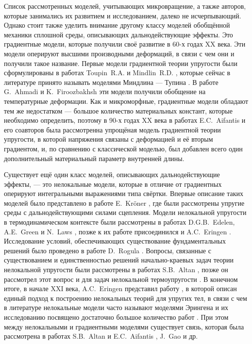 \ifsynopsis
\else
Список рассмотренных моделей, учитывающих микровращение, а также авторов, которые занимались их развитием и исследованием, далеко не исчерпывающий. Однако стоит также уделить внимание другому классу моделей обобщённой механики сплошной среды, описывающих дальнодействующие эффекты. Это градиентные модели, которые получили своё развитие в 60-х годах XX века. Эти модели оперируют высшими производными деформаций, в связи с чем они и получили такое название. Первые модели градиентной теории упругости были сформулированы в работах Toupin~R.A. \cite{Toupin} и Mindlin~R.D. \cite{Mindlin4, Mindlin5}, которые сейчас в литературе принято называть моделями Миндлина --- Тупина \cite{ToupinMindlin1, ToupinMindlin2, ToupinMindlin3}. В работе G.~Ahmadi и K.~Firoozbakhsh \cite{GradientThermoelasticity} эти модели получили обобщение на температурные деформации. Как и микроморфные, градиентные модели обладают тем же недостатком --- большое количество материальных констант, которые необходимо определить, поэтому в 90-х годах XX века в работах E.C.~Aifantis и его соавторов \cite{Aifantis1, Aifantis2} была рассмотренна упрощёная модель градиентной теории упругости, в которой напряжения связаны с деформацией и её вторым градиентом, и, по сравнению с классической моделью, был добавлен всего один дополнительный материальный параметр внутренней длины.
\fi

\ifsynopsis
\else
Существует ещё один класс моделей, описывающих дальнодействующие эффекты, --- это нелокальные модели, которые в отличие от градиентных оперируют интегральными выражениями типа свёртки. Впервые описание таких моделей было представлено в работе E.~Kr{\"o}ner \cite{Kroner}, где были рассмотрены упругие среды с дальнодействующими силами сцепления. Модели нелокальной упругости в термодинамическом контексте были рассмотрены в работах D.G.B.~Edelen, A.E.~Green и N.~Laws \cite{Edelen1, Edelen2}, позже к их работе присоединился и A.C.~Eringen \cite{Eringen5, Eringen6}. Исследование условий, обеспечивающих существование фундаментальных решений было проведено в работе D.~Rogula \cite{Rogula1982}. Вопросы, связанные с существованием и единственностью решений начально-краевых задач теории нелокальной упругости были рассмотрены в работах S.B.~Altan \mbox{\cite{Altan1, Altan2},} позже он рассмотрел этот вопрос и для задач нелокальной термоупругости \mbox{\cite{Altan3, Altan4}.} В конечном итоге, в начале XXI века, A.C.~Eringen представил работу \cite{Eringen1}, в которой описан единый подход к построению нелокальных теорий для упругих тел, в связи с чем в литературе нелокальные модели часто называют моделями Эрингена и их исследованию посвящено достаточно большое количество работ \cite{BondaryLayer, Tuna, Rahmani}. При этом между нелокальными и градиентными моделями существует связь, которая была рассмотрена в работах S.B.~Altan и E.C.~Aifantis \cite{Aifantis3}, J.~Gao \cite{Gao} и др.
\fi


